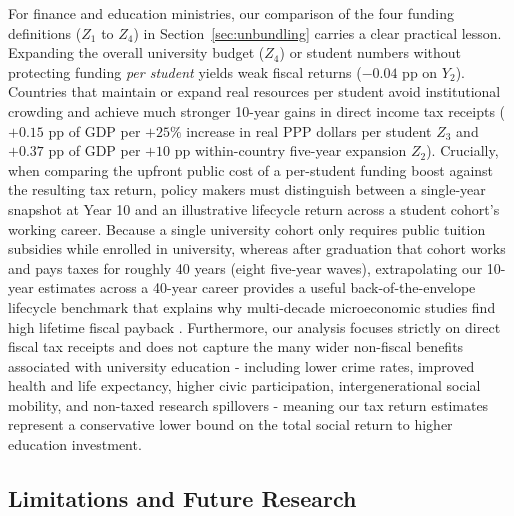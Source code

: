 \documentclass[11pt,a4paper]{article}
\begin{document}
For finance and education ministries, our comparison of the four funding definitions ($Z_1$ to $Z_4$) in Section~\ref{sec:unbundling} carries a clear practical lesson. Expanding the overall university budget ($Z_4$) or student numbers without protecting funding \emph{per student} yields weak fiscal returns ($-0.04$ pp on $Y_2$). Countries that maintain or expand real resources per student avoid institutional crowding \citep{bound2010have, deming2017impact, chakrabarti2020state} and achieve much stronger 10-year gains in direct income tax receipts ($+0.15$ pp of GDP per $+25\%$ increase in real PPP dollars per student $Z_3$ and $+0.37$ pp of GDP per $+10$ pp within-country five-year expansion $Z_2$). Crucially, when comparing the upfront public cost of a per-student funding boost against the resulting tax return, policy makers must distinguish between a single-year snapshot at Year 10 and an illustrative lifecycle return across a student cohort's working career. Because a single university cohort only requires public tuition subsidies while enrolled in university, whereas after graduation that cohort works and pays taxes for roughly 40 years (eight five-year waves), extrapolating our 10-year estimates across a 40-year career provides a useful back-of-the-envelope lifecycle benchmark that explains why multi-decade microeconomic studies find high lifetime fiscal payback \citep{trostel2010fiscal, hendren2020unified}. Furthermore, our analysis focuses strictly on direct fiscal tax receipts and does not capture the many wider non-fiscal benefits associated with university education - including lower crime rates, improved health and life expectancy, higher civic participation, intergenerational social mobility, and non-taxed research spillovers \citep{moretti2004estimating, trostel2010fiscal, valero2019economic, chetty2020income} - meaning our tax return estimates represent a conservative lower bound on the total social return to higher education investment.

\subsection{Limitations and Future Research}
\end{document}
